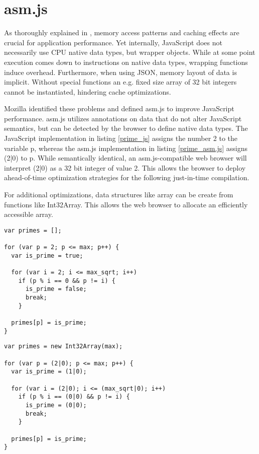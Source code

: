 \section{asm.js} \label{chapter_asm.js}

As thoroughly explained in \cite{memory}, memory access patterns and caching effects are crucial for application performance. Yet internally, JavaScript does not necessarily use CPU native data types, but wrapper objects. While at some point execution comes down to instructions on native data types, wrapping functions induce overhead. Furthermore, when using JSON, memory layout of data is implicit. Without special functions an e.g. fixed size array of 32 bit integers cannot be instantiated, hindering cache optimizations.

Mozilla identified these problems and defined asm.js to improve JavaScript performance. asm.js utilizes annotations on data that do not alter JavaScript semantics, but can be detected by the browser to define native data types. The JavaScript implementation in listing \ref{prime_js} assigns the number 2 to the variable p, whereas the asm.js implementation in listing \ref{prime_asm.js} assigns (2|0) to p. While semantically identical, an asm.js-compatible web browser will interpret (2|0) as a 32 bit integer of value 2. This allows the browser to deploy ahead-of-time optimization strategies for the following just-in-time compilation. \cite{asm.js_spec}

For additional optimizations, data structures like array can be create from functions like Int32Array. This allows the web browser to allocate an efficiently accessible array.

\begin{lstlisting}[frame=single,basicstyle=\footnotesize]
var primes = [];

for (var p = 2; p <= max; p++) {
  var is_prime = true;
  
  for (var i = 2; i <= max_sqrt; i++)
    if (p % i == 0 && p != i) {
      is_prime = false;
      break;
    } 
    
  primes[p] = is_prime;
}
\end{lstlisting}

\begin{lstlisting}[frame=single,basicstyle=\footnotesize]
var primes = new Int32Array(max);

for (var p = (2|0); p <= max; p++) {
  var is_prime = (1|0);  
  
  for (var i = (2|0); i <= (max_sqrt|0); i++)
    if (p % i == (0|0) && p != i) {
      is_prime = (0|0);
      break;
    }
    
  primes[p] = is_prime;
}
\end{lstlisting}



